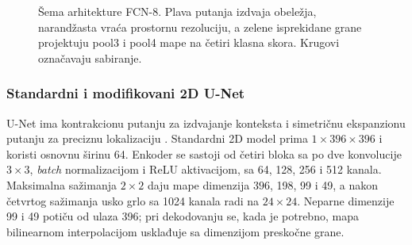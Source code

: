 \documentclass[11pt,a4paper]{article}
\begin{document}
\begin{figure}[H]
{}
	\caption{Šema arhitekture FCN-8. Plava putanja izdvaja obeležja, narandžasta vraća prostornu rezoluciju, a zelene isprekidane grane projektuju pool3 i pool4 mape na četiri klasna skora. Krugovi označavaju sabiranje.}
	\label{fig:fcn8-architecture}
\end{figure}

\subsubsection{Standardni i modifikovani 2D U-Net}
U-Net ima kontrakcionu putanju za izdvajanje konteksta i simetričnu ekspanzionu putanju za preciznu
lokalizaciju \cite{ronneberger2015}. Standardni 2D model prima $1\times396\times396$ i koristi
osnovnu širinu 64. Enkoder se sastoji od četiri bloka sa po dve konvolucije $3\times3$,
\textit{batch} normalizacijom i ReLU aktivacijom, sa 64, 128, 256 i 512 kanala. Maksimalna
sažimanja $2\times2$ daju mape dimenzija $396$, 198, 99 i 49, a nakon četvrtog sažimanja usko grlo
sa 1024 kanala radi na $24\times24$. Neparne dimenzije 99 i 49 potiču od ulaza 396; pri dekodovanju
se, kada je potrebno, mapa bilinearnom interpolacijom usklađuje sa dimenzijom preskočne grane.
\end{document}
